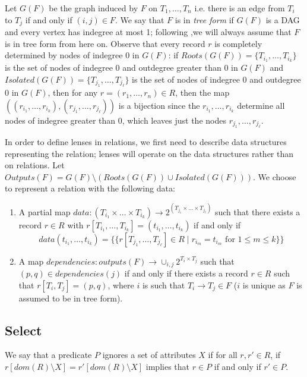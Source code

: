 \documentclass[acmsmall,review,anonymous]{acmart}\settopmatter{printfolios=true,printccs=false,printacmref=false}
\theoremstyle{definition}
\begin{document}
Let $G(F)$ be the graph induced by $F$ on $T_1, \ldots, T_n$ i.e. there is an
edge from $T_i$ to $T_j$ if and only if $(i, j) \in F$. We say that $F$ is
in {\em tree form} if $G(F)$ is a DAG and every vertex has indegree at most 1;
following \cite{bohannon2006relational},we will always assume that $F$ is in
tree form from here on. Observe that every record $r$ is completely determined
by nodes of indegree 0 in $G(F)$: if $Roots(G(F)) = \{T_{i_1}, \ldots,
T_{i_k}\}$ is the set of nodes of indegree 0 and outdegree greater than 0 in
$G(F)$ and $Isolated(G(F)) = \{T_{j_1}, \ldots, T_{j_\ell}\}$ is the set of
nodes of indegree 0 and outdegree 0 in $G(F)$, then for any $r = (r_1, \ldots,
r_n)\in R$, then the map $((r_{i_1}, \ldots, r_{i_k}), (r_{j_1}, \ldots,
r_{j_\ell}))$ is a bijection since the $r_{i_1}, \ldots, r_{i_k}$ determine all
nodes of indegree greater than 0, which leaves just the nodes $r_{j_1}, \ldots,
r_{j_\ell}$.

In order to define lenses in relations, we first need to describe data
structures representing the relation; lenses will operate on the data
structures rather than on relations. Let $Outputs(F) = G(F) \setminus
(Roots(G(F)) \cup Isolated(G(F)))$. We choose to represent a relation with the
following data:
\begin{enumerate}
  \item
  A partial map $data : (T_{i_1} \times \ldots \times T_{i_k})
  \longrightarrow 2^{(T_{j_1} \times \ldots \times T_{j_{\ell}})}$ such that
  there exists a record $r \in R$ with $r[T_{i_1}, \ldots, T_{i_k}] =
  (t_{i_1}, \ldots, t_{i_k})$ if and only if
  $$data(t_{i_1}, \ldots, t_{i_k}) =  \{\{r[T_{j_1}, \ldots, T_{j_{\ell}}] \in
  R \; | \; r_{i_m} = t_{i_m} \text{ for }1 \leq m \leq k\}\}$$
  \item
  A map $dependencies : outputs(F) \longrightarrow \cup_{i,j} 2^{T_i \times
  T_j}$ such that $(p, q) \in dependencies(j)$ if and only if there exists a
  record $r \in R$ such that $r[T_i, T_j] = (p, q)$, where $i$ is such that
  $T_i \longrightarrow T_j \in F$ ($i$ is unique as $F$ is assumed to be in tree
  form).
\end{enumerate}
\subsection{Select}
We say that a predicate $P$ ignores a set of attributes $X$ if for all $r, r'
\in R$, if $r[dom(R) \setminus X] = r'[dom(R) \setminus X]$ implies that $r
\in P$ if and only if $r' \in P$.
\end{document}
